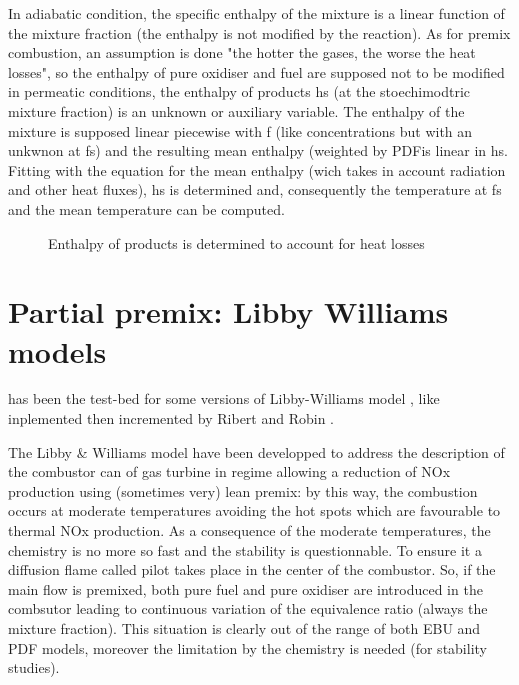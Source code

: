 In adiabatic condition, the specific enthalpy of the mixture is a
linear function of the mixture fraction ({\small the enthalpy is not
modified by the reaction}). As for premix combustion, an assumption is
done "the hotter the gases, the worse the heat losses", so the
enthalpy of pure oxidiser and fuel are supposed not to be modified in
permeatic conditions, the enthalpy of products hs ({\small at the
stoechimodtric mixture fraction}) is an unknown or auxiliary
variable. The enthalpy of the mixture is supposed linear piecewise
with f ({\small like concentrations but with an unkwnon at fs}) and
the resulting mean enthalpy ({\small weighted by PDF}is linear in
hs. Fitting with the equation for the mean enthalpy ({\small wich
takes in account radiation and other heat fluxes}), hs is determined
and, consequently the temperature at fs and the mean temperature can
be computed.

\begin{figure}[h]
\caption{Enthalpy of products is determined to account for heat losses }
\end{figure}

\section{Partial premix: Libby Williams models}


\CS has been the test-bed for some versions of Libby-Williams model \cite{2}, like inplemented then incremented by Ribert \cite{5} and Robin \cite{6}.

The Libby \& Williams model have been developped to address the
description of the combustor can of gas turbine in regime allowing a
reduction of NOx production using ({\small sometimes very}) lean
premix: by this way, the combustion occurs at moderate temperatures
avoiding the hot spots which are favourable to thermal NOx
production. As a consequence of the moderate temperatures, the
chemistry is no more so fast and the stability is questionnable. To
ensure it a diffusion flame called pilot takes place in the center of
the combustor. So, if the main flow is premixed, both pure fuel and
pure oxidiser are introduced in the combsutor leading to continuous
variation of the equivalence ratio ({\small always the mixture
fraction}). This situation is clearly out of the range of both EBU and
PDF models, moreover the limitation by the chemistry is needed
({\small for stability studies}).\\

